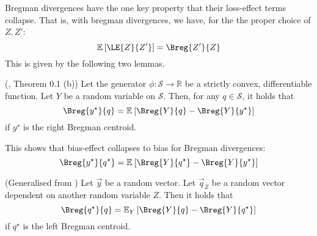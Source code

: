 \documentclass[../main.tex]{subfiles}
\begin{document}


Bregman divergences have the one key property that their loss-effect terms collapse. That is, with bregman divergences, we have, for the the proper choice of $Z, Z'$:
$$
\mathbb{E}\left[\LE{Z}{Z'}\right] = \Breg{Z'}{Z}
$$
This is given by the following two lemmas. 

\begin{lemma} \label{thm:bregman-collapse-bias} (\cite{pfau}, Theorem 0.1 (b))
Let the generator $\phi: \mathcal{S} \to \mathbb{R}$ be a strictly convex, differentiable function. Let $Y$ be a random variable on $\mathcal{S}$. Then, for any $q \in \mathcal{S}$, it holds that
$$
\Breg{y^\star}{q} = \mathbb{E}_{}\left[ \Breg{Y}{q}  - \Breg{Y}{y^\star} \right]
$$
if $y^\star$ is the right Bregman centroid.
\end{lemma}

This shows that bias-effect collapses to bias for Bregman divergences: 
$$\Breg{y^\star}{q^\star} = \mathbb{E}_{}\left[ \Breg{Y}{q^\star} - \Breg{Y}{y^\star} \right]$$

\begin{lemma} \label{thm:bregman-collapse-variances} (Generalised from \cite{ref:wood23})
Let $\vec y$ be a random vector. Let $\vec q_{Z}$ be a random vector dependent on another random variable $Z$. Then it holds that
$$
\Breg{q^\star}{q} = 
\mathbb{E}_{Y}\left[ \Breg{Y}{q} - \Breg{Y}{q^\star} \right]  \\[1em]
$$
if  $q^\star$ is the left Bregman centroid.
\end{lemma}
\end{document}
